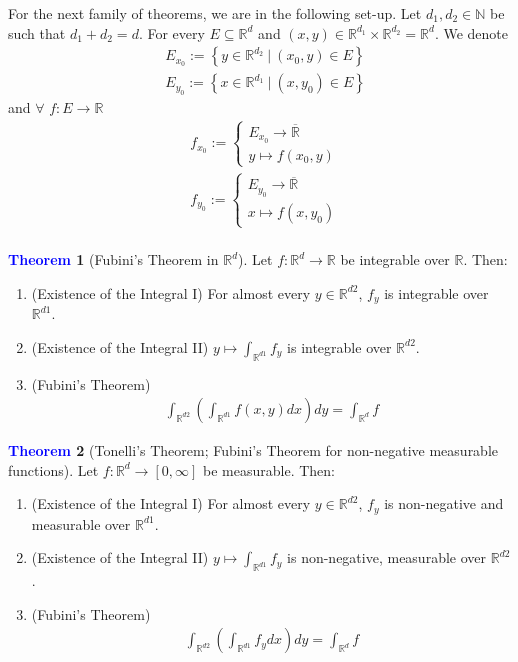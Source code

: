 \documentclass[reqno,11pt]{amsart}
\theoremstyle{definition}
\newcommand{\rd}[0]{\mathbb{R}^d}
\newcommand{\bb}[1]{\mathbb{#1}}
\newcommand{\sets}[2]{ \left\{ #1\ |\ #2 \right\}}
\newtheorem{theorem}{\textcolor{blue}{Theorem}}
\theoremstyle{definition}
\theoremstyle{remark}
\begin{document}
For the next family of theorems, we are in the following set-up. Let $d_1 , d_2 \in \bb{N}$ be such that $d_1 + d_2 = d$. For every $E \subseteq \rd$ and $(x,y) \in \bb{R}^{d_1} \times \bb{R}^{d_2}  = \rd$. We denote
\begin{align*}
	& E_{x_0} := \sets{y \in \bb{R}^{d_2} }{(x_0, y) \in E}	 \\
	& E_{y_0} := \sets{x \in \bb{R}^{d_1} }{(x, y_0) \in E}
\end{align*}
and $\forall$ $f: E \rightarrow \bb{R}$
\begin{align*}
	& f_{x_0} := \begin{cases}
		E_{x_0} \rightarrow \overline{\bb{R}} \\
		y \mapsto f(x_0, y) 
	\end{cases}	 \\
	& f_{y_0} := \begin{cases}
		E_{y_0} \rightarrow \overline{\bb{R}} \\
		x \mapsto f(x, y_0) 
	\end{cases}	 \\
\end{align*}


\begin{theorem}[Fubini's Theorem in $\rd$] 
	Let $f: \rd \rightarrow \bb{R}$ be integrable over $\bb{R}$. Then: 
	\begin{enumerate}[noitemsep]
		\item (Existence of the Integral I) For almost every $y \in \bb{R}^{d2}$, $f_y$ is integrable over $\bb{R}^{d1}$. 
		\item (Existence of the Integral II) $y \mapsto \int_{\bb{R}^{d1}} f_y$ is integrable over $\bb{R}^{d2}$. 
		\item (Fubini's Theorem)
		\begin{align}
			\int_{\bb{R}^{d2}} \left( 	\int_{\bb{R}^{d1}} f(x,y) dx 	\right) dy = \int_{\bb{R}^d} f 
		\end{align}
	\end{enumerate}
\end{theorem}

\begin{theorem}[Tonelli's Theorem; Fubini's Theorem for non-negative measurable functions]
Let $f: \rd \rightarrow [0, \infty]$ be measurable. Then:  
	\begin{enumerate}[noitemsep]
		\item (Existence of the Integral I) For almost every $y \in \bb{R}^{d2}$, $f_y$ is non-negative and measurable over $\bb{R}^{d1}$. 
		\item (Existence of the Integral II) $y \mapsto \int_{\bb{R}^{d1}} f_y$ is non-negative, measurable over $\bb{R}^{d2}$. 
		\item (Fubini's Theorem)
		\begin{align}
			\int_{\bb{R}^{d2}} \left( 	\int_{\bb{R}^{d1}} f_y dx 	\right) dy = \int_{\bb{R}^d} f 
		\end{align}
	\end{enumerate}
\end{theorem}
\end{document}
